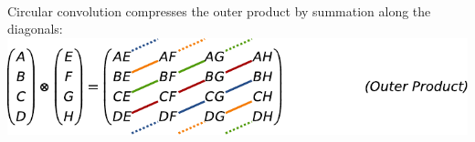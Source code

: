 \documentclass[10pt,letterpaper,oneside]{article}
\begin{document}
{\begin{align*}
\end{align*}
Circular convolution compresses the outer product by summation along the diagonals:\\[0.25cm]
\hspace*{1.315cm}\includegraphics{media/cconv_outer_product.pdf}
}
\end{document}
